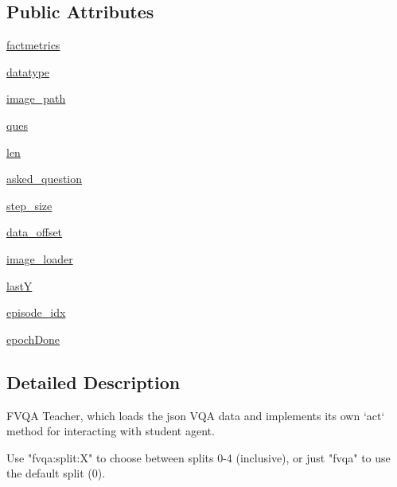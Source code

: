 \subsection*{Public Attributes}
\begin{DoxyCompactItemize}
\item 
\hyperlink{classparlai_1_1tasks_1_1fvqa_1_1agents_1_1SplitTeacher_af9e37d68ef2933f54b5d7f0256ac868d}{factmetrics}
\item 
\hyperlink{classparlai_1_1tasks_1_1fvqa_1_1agents_1_1SplitTeacher_aef55c744ce7578bbe76da7523d38e9ab}{datatype}
\item 
\hyperlink{classparlai_1_1tasks_1_1fvqa_1_1agents_1_1SplitTeacher_a340656d30ffce73b20e4e4eaff111570}{image\+\_\+path}
\item 
\hyperlink{classparlai_1_1tasks_1_1fvqa_1_1agents_1_1SplitTeacher_a0b5fea9e97b0a1d4cf63097f2efcf8da}{ques}
\item 
\hyperlink{classparlai_1_1tasks_1_1fvqa_1_1agents_1_1SplitTeacher_a6543ea6773174b7e252eae4bd4bf7568}{len}
\item 
\hyperlink{classparlai_1_1tasks_1_1fvqa_1_1agents_1_1SplitTeacher_ad621ef602ff9dcaedb554651d524e429}{asked\+\_\+question}
\item 
\hyperlink{classparlai_1_1tasks_1_1fvqa_1_1agents_1_1SplitTeacher_a6d0dd7e2e4ba732905587ef8be1b3613}{step\+\_\+size}
\item 
\hyperlink{classparlai_1_1tasks_1_1fvqa_1_1agents_1_1SplitTeacher_a8f11dc84128c107aff1fc31c8ec91d7c}{data\+\_\+offset}
\item 
\hyperlink{classparlai_1_1tasks_1_1fvqa_1_1agents_1_1SplitTeacher_a838023ecd27c658a6d65bfb741c45213}{image\+\_\+loader}
\item 
\hyperlink{classparlai_1_1tasks_1_1fvqa_1_1agents_1_1SplitTeacher_a1579ae960bedae2a943961e9bdb2edb6}{lastY}
\item 
\hyperlink{classparlai_1_1tasks_1_1fvqa_1_1agents_1_1SplitTeacher_a7aa1bdb6afaaca6321a86b1c80f64b5d}{episode\+\_\+idx}
\item 
\hyperlink{classparlai_1_1tasks_1_1fvqa_1_1agents_1_1SplitTeacher_a3b16ec1a609706b9c8f9bd00ccf7673d}{epoch\+Done}
\end{DoxyCompactItemize}


\subsection{Detailed Description}
\begin{DoxyVerb}FVQA Teacher, which loads the json VQA data and implements its own
`act` method for interacting with student agent.

Use "fvqa:split:X" to choose between splits 0-4 (inclusive), or just
"fvqa" to use the default split (0).
\end{DoxyVerb}
 

